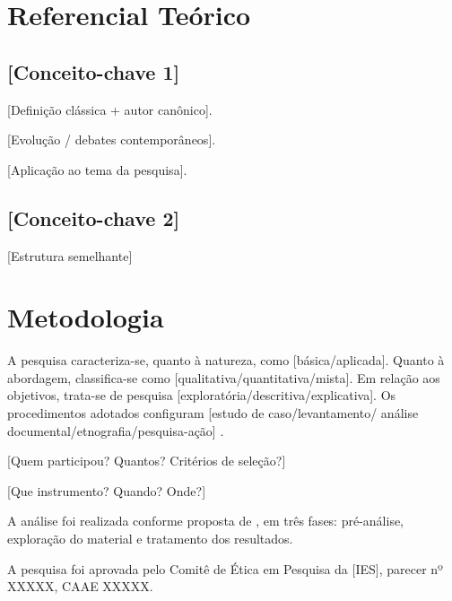 \documentclass[12pt,a4paper]{article}
\begin{document}
\section*{Referencial Teórico}

\subsection*{[Conceito-chave 1]}

[Definição clássica + autor canônico]. \cite[p.~XX]{autor1}

[Evolução / debates contemporâneos]. \cite{autor2,autor3}

[Aplicação ao tema da pesquisa].

\subsection*{[Conceito-chave 2]}

[Estrutura semelhante]

\section*{Metodologia}

A pesquisa caracteriza-se, quanto à natureza, como
[básica/aplicada]. Quanto à abordagem, classifica-se como
[qualitativa/quantitativa/mista]. Em relação aos objetivos,
trata-se de pesquisa [exploratória/descritiva/explicativa]. Os
procedimentos adotados configuram [estudo de caso/levantamento/
análise documental/etnografia/pesquisa-ação]
\citep{gil2017,marconi2017}.

[Quem participou? Quantos? Critérios de seleção?]

[Que instrumento? Quando? Onde?]

A análise foi realizada conforme proposta de , em
três fases: pré-análise, exploração do material e tratamento dos
resultados.

A pesquisa foi aprovada pelo Comitê de Ética em Pesquisa da [IES],
parecer nº XXXXX, CAAE XXXXX.

\end{document}
